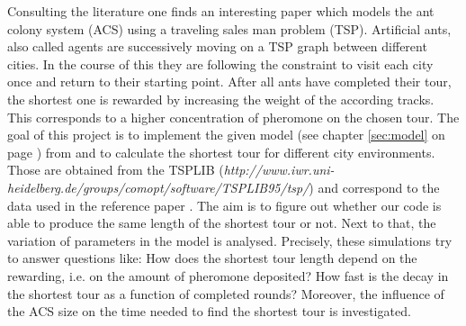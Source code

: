 Consulting the literature \cite{paper} one finds an interesting paper which models the ant colony system (ACS) using a traveling sales man problem (TSP). Artificial ants, also called agents are successively moving on a TSP graph between different cities. In the course of this they are following the constraint to visit each city once and return to their starting point. After all ants have completed their tour, the shortest one is rewarded by increasing the weight of the according tracks. This corresponds to a higher concentration of pheromone on the chosen tour.
The goal of this project is to implement the given model (see chapter \ref{sec:model} on page \pageref{sec:model}) from \cite{paper} and to calculate the shortest tour for different city environments. Those are obtained from the TSPLIB (\emph{http://www.iwr.uni-heidelberg.de/groups/comopt/software/TSPLIB95/tsp/}) and correspond to the data used in the reference paper \cite{paper}. The aim is to figure out whether our code is able to produce the same length of the shortest tour or not. Next to that, the variation of parameters in the model is analysed. Precisely, these simulations try to answer questions like: How does the shortest tour length depend on the rewarding, i.e. on the amount of pheromone deposited? How fast is the decay in the shortest tour as a function of completed rounds? Moreover, the influence of the ACS size on the time needed to find the shortest tour is investigated.